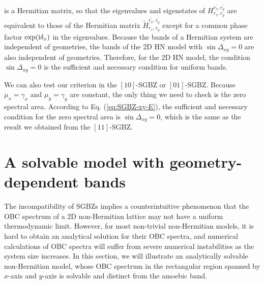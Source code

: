 \documentclass[pdflatex,sn-nature, iicol]{sn-jnl}%
\theoremstyle{thmstyleone}%
\theoremstyle{thmstyletwo}%
\theoremstyle{thmstylethree}%
\begin{document}
is a Hermitian matrix, so that the eigenvalues and eigenstates of
$H_{r_{x},r_{y}}^{r_{x}^{\prime},r_{y}^{\prime}}$ are equivalent
to those of the Hermitian matrix $\tilde{H}_{r_{x},r_{y}}^{r_{x}^{\prime},r_{y}^{\prime}}$
except for a common phase factor $\exp(\mathrm{i}\delta_{x})$ in the eigenvalues.
Because the bands of a Hermitian system are independent of geometries,
the bands of the 2D HN model with $\sin\Delta_{xy}=0$ are also independent
of geometries. Therefore, for the 2D HN model, the condition $\sin\Delta_{xy}=0$
is the sufficient and necessary condition for uniform bands.

We can also test our criterion in the $[10]$-SGBZ or $[01]$-SGBZ.
Because $\mu_{x}=\gamma_{x}$ and $\mu_{y}=\gamma_{y}$ are constant,
the only thing we need to check is the zero spectral area. According
to Eq. (\ref{eq:SGBZ-xy-E}), the sufficient and necessary condition
for the zero spectral area is $\sin\Delta_{xy}=0$, which is the same
as the result we obtained from the $[11]$-SGBZ.

\pagebreak
\section{A solvable model with geometry-dependent bands}

The incompatibility of SGBZs implies a counterintuitive phenomenon
that the OBC spectrum of a 2D non-Hermitian lattice may not have a
uniform thermodynamic limit. However, for most non-trivial non-Hermitian
models, it is hard to obtain an analytical solution for their OBC
spectra, and numerical calculations of OBC spectra will suffer from
severe numerical instabilities as the system size increases. In this
section, we will illustrate an analytically solvable non-Hermitian
model, whose OBC spectrum in the rectangular region spanned by $x$-axis
and $y$-axis is solvable and distinct from the amoebic band.
\end{document}
